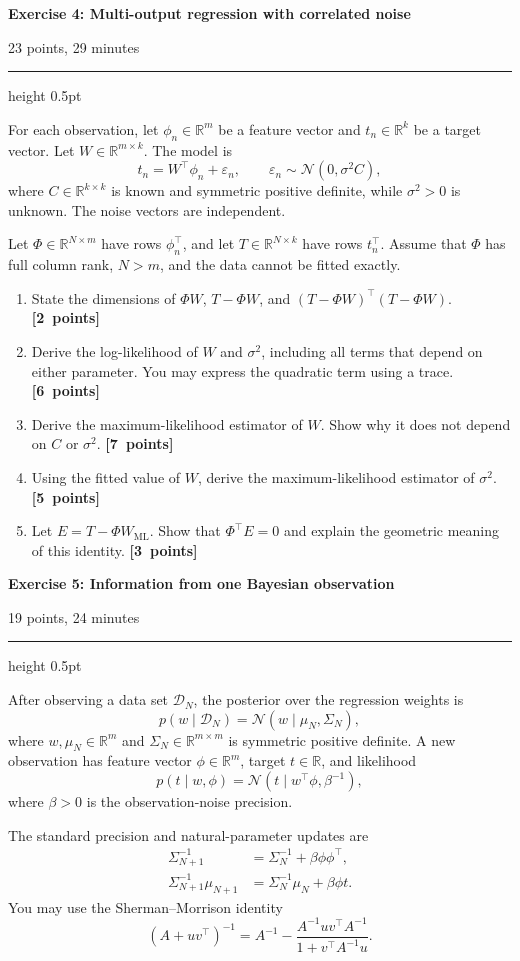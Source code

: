 \documentclass[11pt,a4paper]{article}
\newcommand{\points}[1]{\unskip\nobreak\hfill\mbox{\textbf{[#1 points]}}}
\newcommand{\exercise}[3]{%
  \Needspace{8\baselineskip}%
  \par\addvspace{1.1em}%
  \noindent
  \begin{minipage}[t]{0.73\textwidth}
    \vspace{0pt}\raggedright\large\bfseries\color{examblue}
    Exercise #1: #2
  \end{minipage}\hfill
  \begin{minipage}[t]{0.24\textwidth}
    \vspace{0pt}\raggedleft\small\color{examblue}#3
  \end{minipage}%
  \par\nobreak\vspace{0.2em}%
  {\color{rulegray}\hrule height 0.5pt}%
  \vspace{0.55em}%
}
\begin{document}
\exercise{4}{Multi-output regression with correlated noise}{23 points, 29 minutes}

For each observation, let $\phi_n\in\mathbb{R}^m$ be a feature vector and $t_n\in\mathbb{R}^k$ be a target vector. Let $W\in\mathbb{R}^{m\times k}$. The model is
\[
  t_n=W^\top\phi_n+\varepsilon_n,
  \qquad
  \varepsilon_n\sim\mathcal{N}(0,\sigma^2C),
\]
where $C\in\mathbb{R}^{k\times k}$ is known and symmetric positive definite, while $\sigma^2>0$ is unknown. The noise vectors are independent.

Let $\Phi\in\mathbb{R}^{N\times m}$ have rows $\phi_n^\top$, and let $T\in\mathbb{R}^{N\times k}$ have rows $t_n^\top$. Assume that $\Phi$ has full column rank, $N>m$, and the data cannot be fitted exactly.

\begin{enumerate}
  \item State the dimensions of $\Phi W$, $T-\Phi W$, and $(T-\Phi W)^\top(T-\Phi W)$. \points{2}
  \item Derive the log-likelihood of $W$ and $\sigma^2$, including all terms that depend on either parameter. You may express the quadratic term using a trace. \points{6}
  \item Derive the maximum-likelihood estimator of $W$. Show why it does not depend on $C$ or $\sigma^2$. \points{7}
  \item Using the fitted value of $W$, derive the maximum-likelihood estimator of $\sigma^2$. \points{5}
  \item Let $E=T-\Phi W_{\mathrm{ML}}$. Show that $\Phi^\top E=0$ and explain the geometric meaning of this identity. \points{3}
\end{enumerate}

\exercise{5}{Information from one Bayesian observation}{19 points, 24 minutes}

After observing a data set $\mathcal{D}_N$, the posterior over the regression weights is
\[
  p(w\mid\mathcal{D}_N)=\mathcal{N}(w\mid\mu_N,\Sigma_N),
\]
where $w,\mu_N\in\mathbb{R}^m$ and $\Sigma_N\in\mathbb{R}^{m\times m}$ is symmetric positive definite. A new observation has feature vector $\phi\in\mathbb{R}^m$, target $t\in\mathbb{R}$, and likelihood
\[
  p(t\mid w,\phi)=\mathcal{N}(t\mid w^\top\phi,\beta^{-1}),
\]
where $\beta>0$ is the observation-noise precision.

The standard precision and natural-parameter updates are
\begin{align*}
  \Sigma_{N+1}^{-1} &= \Sigma_N^{-1}+\beta\phi\phi^\top,\\
  \Sigma_{N+1}^{-1}\mu_{N+1} &= \Sigma_N^{-1}\mu_N+\beta\phi t.
\end{align*}
You may use the Sherman--Morrison identity
\[
  (A+uv^\top)^{-1}
  =A^{-1}-\frac{A^{-1}uv^\top A^{-1}}{1+v^\top A^{-1}u}.
\]
\end{document}
